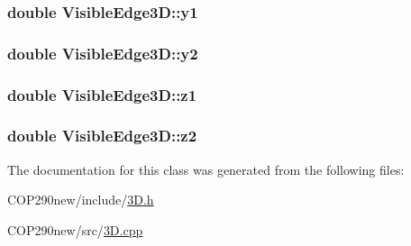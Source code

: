 \subsubsection[{\texorpdfstring{y1}{y1}}]{\setlength{\rightskip}{0pt plus 5cm}double Visible\+Edge3\+D\+::y1}\hypertarget{class_visible_edge3_d_a96f5459cf496dfa36a58d87bf0aa2b7a}{}\label{class_visible_edge3_d_a96f5459cf496dfa36a58d87bf0aa2b7a}
\subsubsection[{\texorpdfstring{y2}{y2}}]{\setlength{\rightskip}{0pt plus 5cm}double Visible\+Edge3\+D\+::y2}\hypertarget{class_visible_edge3_d_abe3cb984d99210979f5ebbd583a57487}{}\label{class_visible_edge3_d_abe3cb984d99210979f5ebbd583a57487}
\subsubsection[{\texorpdfstring{z1}{z1}}]{\setlength{\rightskip}{0pt plus 5cm}double Visible\+Edge3\+D\+::z1}\hypertarget{class_visible_edge3_d_a0bcaa07147aa73ef6d0d7d3ab8ffcda9}{}\label{class_visible_edge3_d_a0bcaa07147aa73ef6d0d7d3ab8ffcda9}
\subsubsection[{\texorpdfstring{z2}{z2}}]{\setlength{\rightskip}{0pt plus 5cm}double Visible\+Edge3\+D\+::z2}\hypertarget{class_visible_edge3_d_acceabf9443fc361822b88ef461512fe3}{}\label{class_visible_edge3_d_acceabf9443fc361822b88ef461512fe3}


The documentation for this class was generated from the following files\+:\begin{DoxyCompactItemize}
\item 
C\+O\+P290new/include/\hyperlink{3_d_8h}{3\+D.\+h}\item 
C\+O\+P290new/src/\hyperlink{3_d_8cpp}{3\+D.\+cpp}\end{DoxyCompactItemize}
